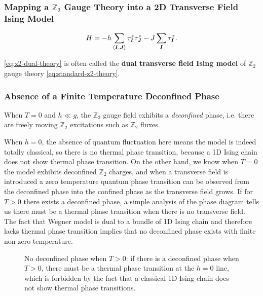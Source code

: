 \documentclass[hyperref, a4paper]{article}
\newcommand*{\pair}[1]{\langle #1 \rangle}
\newcommand*{\concept}[1]{{\textbf{#1}}}
\newcommand*{\Ztwo}{$\mathbb{Z}_2$ }
\newcommand*{\tfim}{transverse field Ising model }
\newcommand*{\TFIM}{Transverse Field Ising Model }
\begin{document}
\subsubsection{Mapping a \Ztwo Gauge Theory into a 2D \TFIM}

\begin{equation}
    H = - h \sum_{\pair{\vb*{I}, \vb*{J}}} \tau^z_{\vb*{I}} \tau^z_{\vb*{J}} - J \sum_{\vb*{I}} \tau^x_{\vb*{I}}.
    \label{eq:z2-dual-theory}
\end{equation}

\eqref{eq:z2-dual-theory} is often called the \concept{dual \tfim} of \Ztwo gauge theory \eqref{eq:standard-z2-theory}.

\subsubsection{Absence of a Finite Temperature Deconfined Phase}\label{sec:absence-of-z2-deconfined-phase}

When $T=0$ and $h \ll g$, the \Ztwo gauge field exhibits a \emph{deconfined} phase, i.e. there are freely moving \Ztwo excitations such as \Ztwo fluxes.

When $h = 0$, the absence of quantum fluctuation here means the model is indeed totally classical, so there is no thermal phase transition, because a 1D Ising chain does not show thermal phase transition.
On the other hand, we know when $T=0$ the model exhibits deconfined \Ztwo charges, and when a transverse field is introduced a zero temperature quantum phase transition can be observed from the deconfined phase into the confined phase as the transverse field grows.
If for $T > 0$ there exists a deconfined phase, a simple analysis of the phase diagram tells us there must be a thermal phase transition when there is no transverse field.
The fact that Wegner model is dual to a bundle of 1D Ising chain and therefore lacks thermal phase transition implies that no deconfined phase exists with finite non zero temperature.

\begin{figure}
    \centering
    
    \caption{No deconfined phase when $T > 0$: if there is a deconfined phase when $T > 0$, there must be a thermal phase transition at the $h=0$ line, which is forbidden by the fact that a classical 1D Ising chain does not show thermal phase transitions.}
\end{figure}
\end{document}

